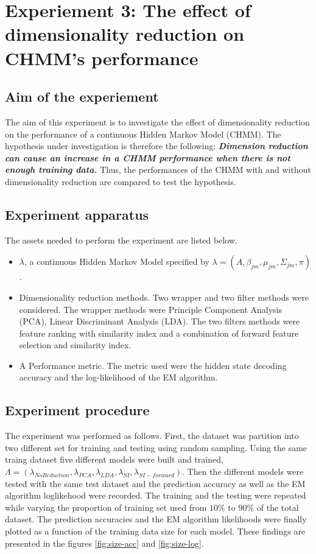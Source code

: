 \section{Experiement 3: The effect of dimensionality reduction on CHMM's performance}  \label{exp:dim}

\subsection{Aim of the experiement}
The aim of this experiment is to investigate the effect of dimensionality reduction on the performance of a continuous Hidden Markov Model (CHMM).
The hypothesis under investigation is therefore the following:
\textbf{\textit{Dimension reduction can cause an increase in a CHMM performance when there is not enough training data.}}
Thus, the performances of the CHMM with and without dimensionality reduction are compared to test the hypothesis.

\subsection{Experiment apparatus}
The assets needed to perform the experiment are listed below.
\begin{itemize}
	\item \(\lambda\), a continuous Hidden Markov Model specified by \(\lambda = (A, \beta_{jm}, \mu_{jm}, \Sigma_{jm}, \pi)\).
	\item Dimensionality reduction methods. Two wrapper and two filter methods were considered. The wrapper methods were Principle Component Analysis (PCA), Linear Discriminant Analysis (LDA). The two filters methods were feature ranking with similarity index %
	and a combination of forward feature selection and similarity index.
	\item A Performance metric. The metric used were the hidden state decoding accuracy and the log-likelihood of the EM algorithm.
\end{itemize}

\subsection{Experiment procedure}
The experiment was performed as follows.
First, the dataset was partition into two different set for training and testing using random sampling.
Using the same traing dataset five different models were built and trained, \(\Lambda = (\lambda_{No Reduction}, \lambda_{PCA}, \lambda_{LDA}, \lambda_{SI}, \lambda_{SI-forward})\).
Then the different models were tested with the same test dataset and the prediction accuracy as well as the EM algorithm loglikehood were recorded.
The training and the testing were repeated while varying the proportion of training set used from \(10\%\) to \(90\%\) of the total dataset.
The prediction accuracies and the EM algorithm likelihoods were finally plotted as a function of the training data size for each model.
These findings are presented in the figures \ref{fig:size-acc} and \ref{fig:size-log}. 

